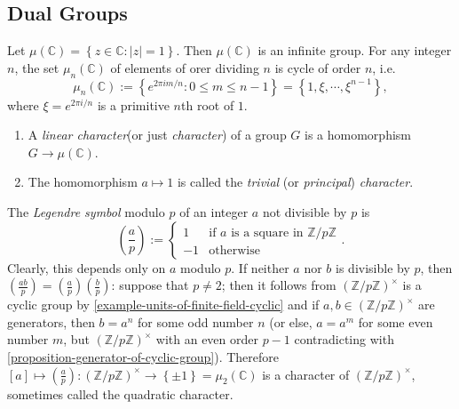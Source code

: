 \subsection{Dual Groups}
\label{subsection-dual-groups}

Let \( \mu(\mathbb{C}) = \left\lbrace z \in \mathbb{C}: \left\vert z \right\vert = 1 \right\rbrace \).
Then \( \mu(\mathbb{C}) \) is an infinite group.
For any integer \( n \), the set \( \mu_n(\mathbb{C}) \) of elements of orer dividing \( n \) is cycle of order \( n \), i.e.
\[
  \mu_n(\mathbb{C}) := \left\lbrace e^{2\pi i m / n}: 0 \leq m \leq n - 1 \right\rbrace = \left\lbrace 1, \xi, \cdots, \xi^{n - 1} \right\rbrace,
\]
where \( \xi = e^{2 \pi i / n} \) is a primitive \( n \)th root of \( 1 \).

\begin{definition}
  \label{definition-linear-character}
  \label{definition-prinicipal-character}
  \begin{enumerate}
    \item A \emph{linear character}(or just \emph{character}) of a group \( G \) is a homomorphism \( G \to \mu(\mathbb{C}) \).
    \item The homomorphism \( a \mapsto 1 \) is called the \emph{trivial} (or \emph{principal}) \emph{character}.
  \end{enumerate}
\end{definition}

\begin{example}
  \label{example-Legendre-symbol}
  The \emph{Legendre symbol} modulo \( p \) of an integer \( a \) not divisible by \( p \) is
  \[
    \left(\frac{a}{p}\right) := \begin{cases}
      1 &\text{if } a \text{ is a square in } \mathbb{Z} / p\mathbb{Z}\\
      -1 & \text{otherwise}
    \end{cases}.
  \]
  Clearly, this depends only on \( a \) modulo \( p \).
  If neither \( a \) nor \( b \) is divisible by \( p \), then \( \left(\frac{ab}{p}\right) = \left(\frac{a}{p}\right)\left(\frac{b}{p}\right) \): suppose that \( p \neq 2 \);
  then it follows from \( (\mathbb{Z} / p \mathbb{Z})^\times \) is a cyclic group by \ref{example-units-of-finite-field-cyclic} and if \( a, b \in (\mathbb{Z} / p \mathbb{Z})^\times \) are generators, then \( b = a^{n} \) for some odd number \( n \)
  (or else, \( a = a^{m} \) for some even number \( m \), but \( (\mathbb{Z}/ p \mathbb{Z})^\times \) with an even order \( p - 1 \) contradicting with \ref{proposition-generator-of-cyclic-group}).
  Therefore \( [a] \mapsto \left(\frac{a}{p}\right): \left(\mathbb{Z} / p \mathbb{Z}\right)^\times \to \left\lbrace \pm 1 \right\rbrace = \mu_2(\mathbb{C}) \) is a character of \( \left(\mathbb{Z} / p \mathbb{Z}\right)^\times \), sometimes called the quadratic character.
\end{example}

